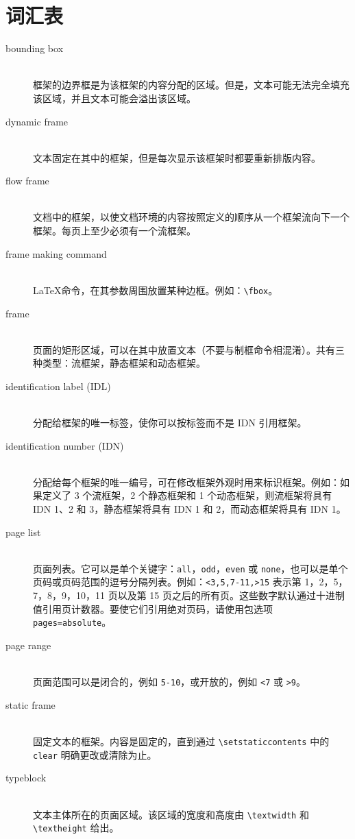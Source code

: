 \documentclass[a4paper]{book}%
\newcommand{\cmd}[1]{\texttt{#1}}
\begin{document}
\chapter*{词汇表}%
\disablethumbtabs
{}
\begin{description}
    \item[bounding box] \mbox{}\\ 框架的边界框是为该框架的内容分配的区域。但是，文本可能无法完全填充该区域，并且文本可能会溢出该区域。
    \item[dynamic frame] \mbox{}\\ 文本固定在其中的框架，但是每次显示该框架时都要重新排版内容。
    \item[flow frame] \mbox{}\\ 文档中的框架，以使文档环境的内容按照定义的顺序从一个框架流向下一个框架。每页上至少必须有一个流框架。
    \item[frame making command] \mbox{}\\ \LaTeX 命令，在其参数周围放置某种边框。例如：\verb|\fbox|。
    \item[frame] \mbox{}\\ 页面的矩形区域，可以在其中放置文本（不要与制框命令相混淆）。共有三种类型：流框架，静态框架和动态框架。
    \item[identification label (IDL)] \mbox{}\\ 分配给框架的唯一标签，使你可以按标签而不是 IDN 引用框架。
    \item[identification number (IDN)] \mbox{}\\ 分配给每个框架的唯一编号，可在修改框架外观时用来标识框架。例如：如果定义了 3 个流框架，2 个静态框架和 1 个动态框架，则流框架将具有 IDN 1、2 和 3，静态框架将具有 IDN 1 和 2，而动态框架将具有 IDN 1。
    \item[page list] \mbox{}\\ 页面列表。它可以是单个关键字：\cmd{all}，\cmd{odd}，\cmd{even} 或 \cmd{none}，也可以是单个页码或页码范围的逗号分隔列表。例如：\cmd{<3,5,7-11,>15} 表示第 1，2，5，7，8，9，10，11 页以及第 15 页之后的所有页。这些数字默认通过十进制值引用页计数器。要使它们引用绝对页码，请使用包选项 \cmd{pages=absolute}。
    \item[page range] \mbox{}\\ 页面范围可以是闭合的，例如 \cmd{5-10}，或开放的，例如 \cmd{<7} 或 \cmd{>9}。
    \item[static frame] \mbox{}\\ 固定文本的框架。内容是固定的，直到通过 \verb|\setstaticcontents| 中的 \verb|clear| 明确更改或清除为止。
    \item[typeblock] \mbox{}\\ 文本主体所在的页面区域。该区域的宽度和高度由 \verb|\textwidth| 和 \verb|\textheight| 给出。
\end{description}
\clearpage\mbox{}
\end{document}
